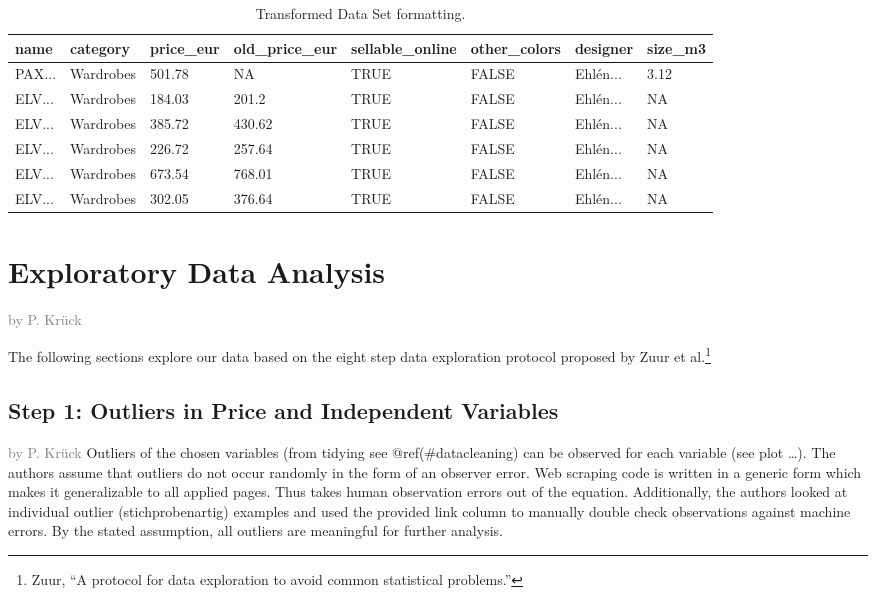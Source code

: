 \documentclass[a4paper, nobind]{templates/ociamthesis}
\begin{document}
\begin{table}

\caption{\label{tab:tidy-ikea}Transformed Data Set formatting.}
\centering
\fontsize{8}{10}\selectfont
\begin{tabular}[t]{l|l|l|l|l|l|l|l}
\hline
name & category & price\_eur & old\_price\_eur & sellable\_online & other\_colors & designer & size\_m3\\
\hline
PAX... & Wardrobes & 501.78 & NA & TRUE & FALSE & Ehlén... & 3.12\\
\hline
ELV... & Wardrobes & 184.03 & 201.2 & TRUE & FALSE & Ehlén... & NA\\
\hline
ELV... & Wardrobes & 385.72 & 430.62 & TRUE & FALSE & Ehlén... & NA\\
\hline
ELV... & Wardrobes & 226.72 & 257.64 & TRUE & FALSE & Ehlén... & NA\\
\hline
ELV... & Wardrobes & 673.54 & 768.01 & TRUE & FALSE & Ehlén... & NA\\
\hline
ELV... & Wardrobes & 302.05 & 376.64 & TRUE & FALSE & Ehlén... & NA\\
\hline
\end{tabular}
\end{table}

\hypertarget{tbd}{%
\section{Exploratory Data Analysis}\label{tbd}}

\textcolor{gray}{by P. Krück}

The following sections explore our data based on the eight step data exploration protocol proposed by Zuur et al.\footnote{Zuur, ``A protocol for data exploration to avoid common statistical problems.''}

\hypertarget{step-1-outliers-in-price-and-independent-variables}{%
\subsection{Step 1: Outliers in Price and Independent Variables}\label{step-1-outliers-in-price-and-independent-variables}}

\textcolor{gray}{by P. Krück}
Outliers of the chosen variables (from tidying see @ref(\#datacleaning) can be observed for each variable (see plot \ldots{}).
The authors assume that outliers do not occur randomly in the form of an observer error. Web scraping code is written in a generic form which makes it generalizable to all applied pages. Thus takes human observation errors out of the equation. Additionally, the authors looked at individual outlier (stichprobenartig) examples and used the provided link column to manually double check observations against machine errors.
By the stated assumption, all outliers are meaningful for further analysis.
\end{document}

